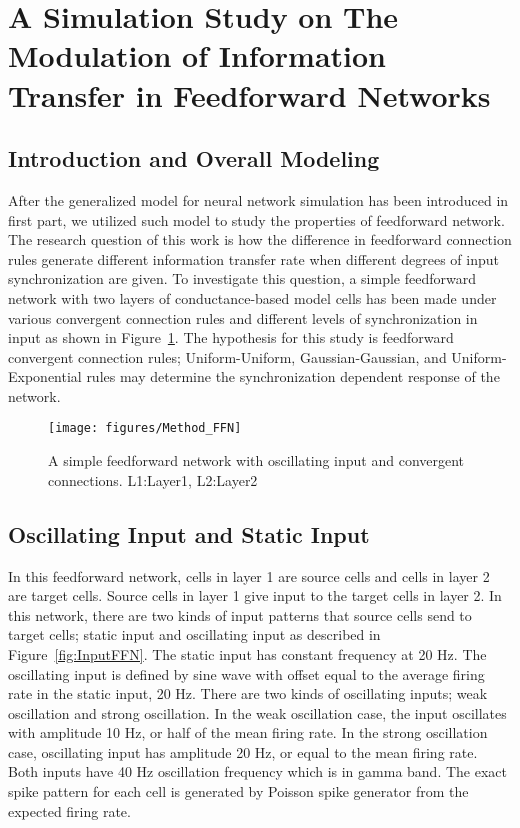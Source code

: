 \section{A Simulation Study on The Modulation of Information Transfer in Feedforward Networks}

\subsection{Introduction and Overall Modeling}

After the generalized model for neural network simulation has been introduced in first part, we utilized such model to study the properties of feedforward network. The research question of this work is how the difference in feedforward connection rules generate different information transfer rate when different degrees of input synchronization are given. To investigate this question, a simple feedforward network with two layers of conductance-based model cells has been made under various convergent connection rules and different levels of synchronization in input as shown in Figure~\ref{fig:FFmodel}. The hypothesis for this study is feedforward convergent connection rules; Uniform-Uniform, Gaussian-Gaussian, and Uniform-Exponential rules may determine the synchronization dependent response of the network.
\begin{figure}[!h]
	\centering
	\texttt{[image: figures/Method\_FFN]}
	\caption[A Feedforward Model]{A simple feedforward network with oscillating input and convergent connections. L1:Layer1, L2:Layer2}
	\label{fig:FFmodel}
\end{figure} 

\subsection{Oscillating Input and Static Input}
 In this feedforward network, cells in layer 1 are source cells and cells in layer 2 are target cells. Source cells in layer 1 give input to the target cells in layer 2. In this network, there are two kinds of input patterns that source cells send to target cells; static input and oscillating input as described in Figure~\ref{fig:InputFFN}. The static input has constant frequency at 20 Hz. The oscillating input is defined by sine wave with offset equal to the average firing rate in the static input, 20 Hz. There are two kinds of oscillating inputs; weak oscillation and strong oscillation. In the weak oscillation case, the input oscillates with amplitude 10 Hz, or half of the mean firing rate. In the strong oscillation case, oscillating input has amplitude 20 Hz, or equal to the mean firing rate. Both inputs have 40 Hz oscillation frequency which is in gamma band. The exact spike pattern for each cell is generated by Poisson spike generator from the expected firing rate.

